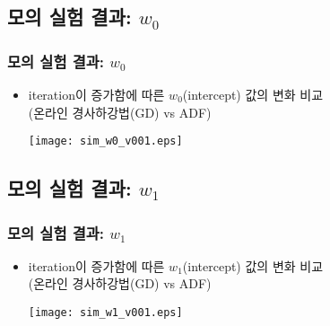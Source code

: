 \documentclass{beamer}
\begin{document}

\subsection{모의 실험 결과: $w_0$} %


\begin{frame}
\frametitle{모의 실험 결과: $w_0$}

\begin{itemize}
\item iteration이 증가함에 따른 $w_0$(intercept) 값의 변화 비교 \\
(온라인 경사하강법(GD) vs ADF)
\begin{center}
\texttt{[image: sim\_w0\_v001.eps]} %
\end{center}

\end{itemize}
\end{frame}







\subsection{모의 실험 결과: $w_1$} %


\begin{frame}
\frametitle{모의 실험 결과: $w_1$}

\begin{itemize}
\item iteration이 증가함에 따른 $w_1$(intercept) 값의 변화 비교 \\
(온라인 경사하강법(GD) vs ADF)
\begin{center}
\texttt{[image: sim\_w1\_v001.eps]} %
\end{center}

\end{itemize}
\end{frame}
\end{document}
